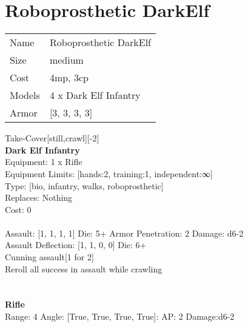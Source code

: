 \pagebreak\pagebreak

\section{ Roboprosthetic DarkElf }

\begin{tabular}{ll}
  Name & Roboprosthetic DarkElf \\
  Size & medium\\
  Cost & 4mp, 3cp\\
  Models & 4 x Dark Elf Infantry\\
  Armor & [3, 3, 3, 3]\\
\end{tabular}

\noindent Take-Cover[still,crawl][-2]\\ 


{\bf Dark Elf Infantry } \\
Equipment: 1 x Rifle \\
Equipment Limits: [hands:2, training:1, independent:∞] \\
Type: [bio, infantry, walks, roboprosthetic] \\
Replaces: Nothing \\
Cost: 0\\
\ \\
Assault: [1, 1, 1, 1] Die: 5+ Armor Penetration: 2 Damage: d6-2 \\
Assault Deflection: [1, 1, 0, 0] Die: 6+\\
\indent Cunning assault[1 for 2]\\ 
Reroll all success in assault while crawling\\ 
 
\ \\

\ \\
{\bf Rifle } \\



Range: 4  Angle: [True, True, True, True]: AP: 2 Damage:d6-2 \\




 
\ \\



